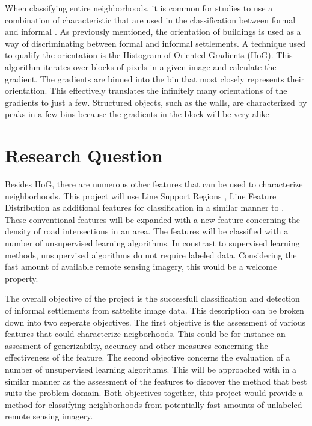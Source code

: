 \documentclass{article}
\begin{document}

When classifying entire neighborhoods, it is common for studies to use a combination
of characteristic that are used in the classification between formal and
informal \cite{graesser2012image}. As previously mentioned, the orientation of
buildings is used as a way of discriminating between formal and informal
settlements. A technique used to qualify the orientation is the Histogram of
Oriented Gradients (HoG)\cite{}. This algorithm iterates over blocks of pixels in a given
image and calculate the gradient. The gradients are binned into
the bin that most closely represents their orientation. This effectively
translates the infinitely many orientations of the gradients to just a few.
Structured objects, such as the walls, are characterized by peaks in a few
bins because the gradients in the block will be very alike






\section{Research Question}

Besides HoG, there are numerous other features that can be used to characterize
neighborhoods. This project will use Line Support Regions \cite{}, Line Feature
Distribution \cite{} as additional features for classification in a similar manner
to \cite{graesser2012image}. These conventional features will be expanded with
a new feature concerning the density of road intersections in an area. The
features will be classified with a number of unsupervised learning algorithms.
In constrast to supervised learning methods, unsupervised algorithms do not
require labeled data. Considering the fast amount of available remote sensing
imagery, this would be a welcome property.

The overall objective of the project is the successfull classification and
detection of informal settlements from sattelite image data. This description
can be broken down into two seperate objectives. The first objective is the
assessment of various features that could characterize neigborhoods. This could
be for instance an assesment of generizabilty, accuracy and other measures
concerning the effectiveness of the feature. The second objective concerns the
evaluation of a number of unsupervised learning algorithms. This will be
approached with in a similar manner as the assessment of the features to
discover the method that best suits the problem domain. Both objectives
together, this project would provide a method for classifying neighborhoods
from potentially fast amounts of unlabeled remote sensing imagery.
\end{document}
